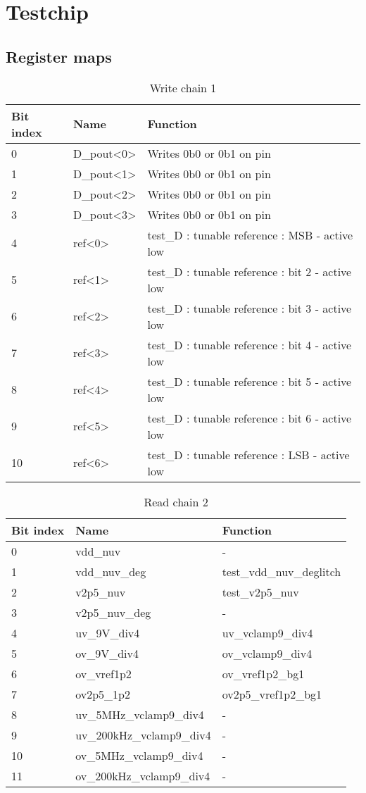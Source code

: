 \chapter{Testchip}
\section{Register maps}
\label{apx:testchip-register-maps}

\begin{table}[!htbp]
\centering
\begin{tabular}{@{}lll@{}}
\toprule
Bit index& Name & Function \\ \toprule
0	& D_pout<0>	  & Writes 0b0 or 0b1 on pin \\
1	& D_pout<1>	  & Writes 0b0 or 0b1 on pin \\
2	& D_pout<2>	  & Writes 0b0 or 0b1 on pin \\
3	& D_pout<3>   & Writes 0b0 or 0b1 on pin \\
4	& ref<0>	    & test_D : tunable reference : MSB - active low \\
5	& ref<1>	    & test_D : tunable reference : bit 2 - active low \\
6	& ref<2>      &	test_D : tunable reference : bit 3 - active low \\
7	& ref<3>      &	test_D : tunable reference : bit 4 - active low \\
8	& ref<4>      &	test_D : tunable reference : bit 5 - active low \\
9	& ref<5>      &	test_D : tunable reference : bit 6 - active low \\
10 &	ref<6>    &	test_D : tunable reference : LSB - active low \\
\bottomrule
\end{tabular}
\caption{Write chain 1}
\label{tab:write-chain-1}
\end{table}

\begin{table}[!htbp]
\centering
\begin{tabular}{@{}lll@{}}
\toprule
Bit index & Name & Function \\ \toprule
0	& vdd_nuv      & - \\
1	& vdd_nuv_deg  &	test_vdd_nuv_deglitch \\
2	& v2p5_nuv	   & test_v2p5_nuv \\
3	& v2p5_nuv_deg & - \\
4	& uv_9V_div4	 & uv_vclamp9_div4 \\
5	& ov_9V_div4	 & ov_vclamp9_div4 \\
6	& ov_vref1p2	 & ov_vref1p2_bg1 \\
7	& ov2p5_1p2	   & ov2p5_vref1p2_bg1 \\
8	&	uv_5MHz_vclamp9_div4  & - \\
9	&	uv_200kHz_vclamp9_div4 & - \\
10&	ov_5MHz_vclamp9_div4 & - \\
11&	ov_200kHz_vclamp9_div4 & - \\
\bottomrule
\end{tabular}
\caption{Read chain 2}
\label{tab:read-chain-2}
\end{table}


